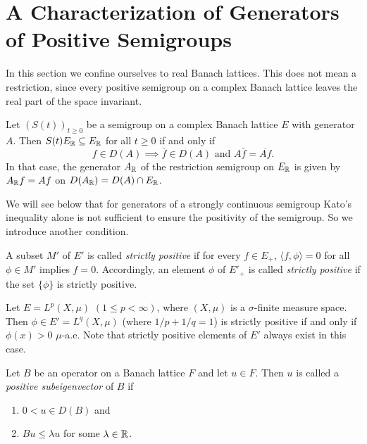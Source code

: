 \section{A Characterization of Generators of Positive Semigroups}\label{sec:c2-3}%
%
In this section we confine ourselves to real Banach lattices.
This does not mean a restriction, since every positive semigroup on a complex Banach lattice leaves the real part of the space invariant.
\begin{remark}\label{rem:c2-3.1}
%
Let $(S(t))_{t \geq 0}$ be a semigroup on a complex Banach lattice $E$ with generator $A$.
Then $S(t)E_{\mathbb{R}} \subseteq E_{\mathbb{R}}$ for all $t \geq 0$ if and only if
\begin{equation}\label{eq:c2-3.1}
f \in D(A) \implies \bar{f} \in D(A) \text{ and } A\bar{f} = \overline{Af}.
\end{equation}
In that case, the generator $A_{\mathbb{R}}$ of the restriction semigroup on $E_{\mathbb{R}}$ is given by\\  $A_{\mathbb{R}}f = Af$ on $D(A_{\mathbb{R}}) = D(A) \cap E_{\mathbb{R}}$.
\end{remark}
We will see below that for generators of a strongly continuous semigroup Kato's inequality alone is not sufficient to ensure the positivity of the semigroup.
So we introduce another condition.
\begin{definition}\label{def:c2-3.2}
%
A subset $M'$ of\/ $E'$ is called \emph{strictly positive} if for every $f \in E_{+}$, $\langle f,\phi \rangle = 0$ for all $\phi \in M'$ implies $f = 0$.
Accordingly, an element $\phi$ of\/ $E'_{+}$ is called \emph{strictly positive} if the set $\{\phi\}$ is strictly positive.
\end{definition}
\begin{example}\label{ex:c2-3.3}
%
Let $E = L^p(X,\mu)$ $(1 \leq p < \infty)$, where $(X,\mu)$ is a $\sigma$-finite measure space.
Then $\phi \in E'
= L^q(X,\mu)$ (where $1/p + 1/q = 1$) is strictly positive if and only if\/ $\phi(x) > 0$ $\mu$-a.e.
Note that strictly positive elements of\/ $E'$ always exist in this case.
\end{example}
\begin{definition}\label{def:c2-3.4}
%
Let $B$ be an operator on a Banach lattice $F$ and let $u \in F$.
Then $u$ is called a \emph{positive subeigenvector} of\/ $B$ if
\begin{enumerate}[\upshape (i)]
\item \label{def:c2-3.4-1}
$0 < u \in D(B)$ and
\item \label{def:c2-3.4-2}
$Bu \leq \lambda u$ for some $\lambda \in \mathbb{R}$.
\end{enumerate}
\end{definition}
